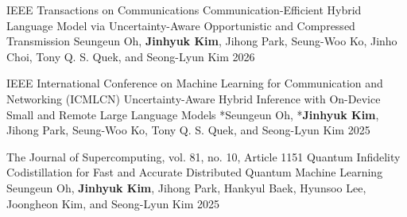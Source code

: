 

\begin{cventries}

  \cventry
  {IEEE Transactions on Communications} %
  {Communication-Efficient Hybrid Language Model via Uncertainty-Aware Opportunistic and Compressed Transmission} %
  {Seungeun Oh, \textbf{Jinhyuk Kim}, Jihong Park, Seung-Woo Ko, Jinho Choi, Tony Q. S. Quek, and Seong-Lyun Kim} %
  {2026} %
  {}

  \cventry
  {IEEE International Conference on Machine Learning for Communication and Networking (ICMLCN)} %
  {Uncertainty-Aware Hybrid Inference with On-Device Small and Remote Large Language Models} %
  {*Seungeun Oh, *\textbf{Jinhyuk Kim}, Jihong Park, Seung-Woo Ko, Tony Q. S. Quek, and Seong-Lyun Kim} %
  {2025} %
  {}

  \cventry
  {The Journal of Supercomputing, vol. 81, no. 10, Article 1151} %
  {Quantum Infidelity Codistillation for Fast and Accurate Distributed Quantum Machine Learning} %
  {Seungeun Oh, \textbf{Jinhyuk Kim}, Jihong Park, Hankyul Baek, Hyunsoo Lee, Joongheon Kim, and Seong-Lyun Kim} %
  {2025} %
  {}

\end{cventries}

